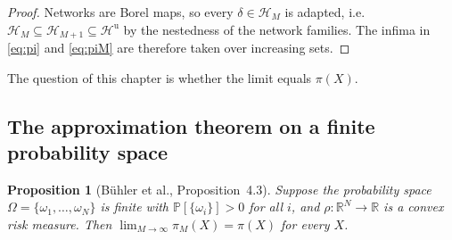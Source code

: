 \documentclass[11pt,a4paper]{report}
\numberwithin{equation}{chapter}
\theoremstyle{plain}
\newtheorem{proposition}{Proposition}[chapter]
\theoremstyle{definition}
\newcommand{\PP}{\mathbb{P}}
\newcommand{\R}{\mathbb{R}}
\newcommand{\HH}{\mathcal{H}}
\newcommand{\Hu}{\mathcal{H}^{\mathrm{u}}}
\begin{document}
\begin{proof}
    Networks are Borel maps, so every $\delta\in\HH_M$ is adapted, i.e.\ $\HH_M\subseteq\HH_{M+1}\subseteq\Hu$ by the nestedness of the network families. The infima in \eqref{eq:pi} and \eqref{eq:piM} are therefore taken over increasing sets.
\end{proof}

The question of this chapter is whether the limit equals $\pi(X)$.

\subsection*{The approximation theorem on a finite probability space}

\begin{proposition}[B\"uhler et al., Proposition~4.3]\label{prop:finite}
    Suppose the probability space $\Omega=\{\omega_1,\dots,\omega_N\}$ is finite with $\PP[\{\omega_i\}]>0$ for all $i$, and $\rho\colon\R^N\to\R$ is a convex risk measure. Then $\lim_{M\to\infty}\pi_M(X)=\pi(X)$ for every $X$.
\end{proposition}
\end{document}
